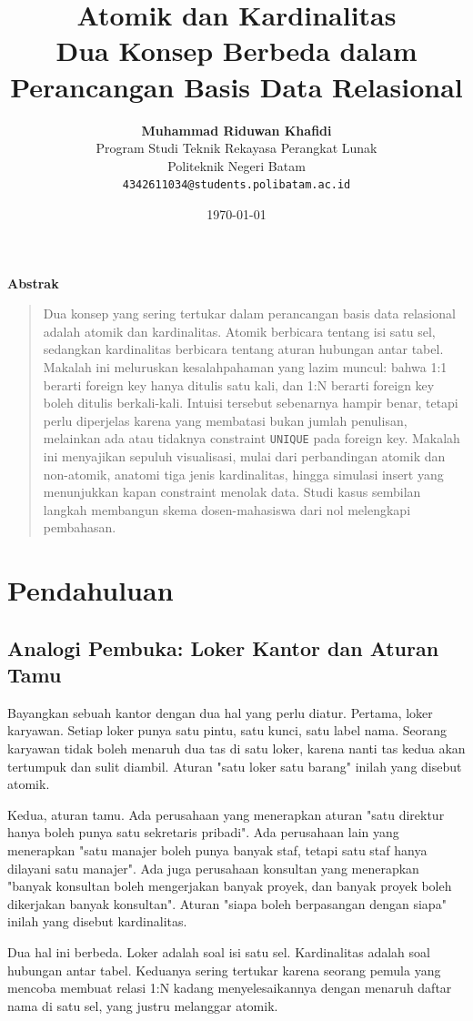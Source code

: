 \documentclass[11pt,a4paper]{article}
\title{\vspace{-1.5cm}\textbf{\sffamily\LARGE Atomik dan Kardinalitas\\ Dua Konsep Berbeda dalam Perancangan Basis Data Relasional}}
\author{
	\textbf{Muhammad Riduwan Khafidi} \\
	\small Program Studi Teknik Rekayasa Perangkat Lunak \\
	\small Politeknik Negeri Batam \\
	\small \texttt{4342611034@students.polibatam.ac.id}
}
\date{\small\today}
\renewenvironment{abstract}
{\small
	\begin{center}\textbf{\sffamily Abstrak}\end{center}
	\begin{quote}}
	{\end{quote}}
\begin{document}
\maketitle
\thispagestyle{empty}

\begin{abstract}
	Dua konsep yang sering tertukar dalam perancangan basis data relasional adalah atomik dan kardinalitas. Atomik berbicara tentang isi satu sel, sedangkan kardinalitas berbicara tentang aturan hubungan antar tabel. Makalah ini meluruskan kesalahpahaman yang lazim muncul: bahwa 1:1 berarti foreign key hanya ditulis satu kali, dan 1:N berarti foreign key boleh ditulis berkali-kali. Intuisi tersebut sebenarnya hampir benar, tetapi perlu diperjelas karena yang membatasi bukan jumlah penulisan, melainkan ada atau tidaknya constraint \texttt{UNIQUE} pada foreign key. Makalah ini menyajikan sepuluh visualisasi, mulai dari perbandingan atomik dan non-atomik, anatomi tiga jenis kardinalitas, hingga simulasi insert yang menunjukkan kapan constraint menolak data. Studi kasus sembilan langkah membangun skema dosen-mahasiswa dari nol melengkapi pembahasan.
\end{abstract}

\section{Pendahuluan}

\subsection{Analogi Pembuka: Loker Kantor dan Aturan Tamu}

Bayangkan sebuah kantor dengan dua hal yang perlu diatur. Pertama, loker karyawan. Setiap loker punya satu pintu, satu kunci, satu label nama. Seorang karyawan tidak boleh menaruh dua tas di satu loker, karena nanti tas kedua akan tertumpuk dan sulit diambil. Aturan "satu loker satu barang" inilah yang disebut atomik.

Kedua, aturan tamu. Ada perusahaan yang menerapkan aturan "satu direktur hanya boleh punya satu sekretaris pribadi". Ada perusahaan lain yang menerapkan "satu manajer boleh punya banyak staf, tetapi satu staf hanya dilayani satu manajer". Ada juga perusahaan konsultan yang menerapkan "banyak konsultan boleh mengerjakan banyak proyek, dan banyak proyek boleh dikerjakan banyak konsultan". Aturan "siapa boleh berpasangan dengan siapa" inilah yang disebut kardinalitas.

Dua hal ini berbeda. Loker adalah soal isi satu sel. Kardinalitas adalah soal hubungan antar tabel. Keduanya sering tertukar karena seorang pemula yang mencoba membuat relasi 1:N kadang menyelesaikannya dengan menaruh daftar nama di satu sel, yang justru melanggar atomik.
\end{document}
